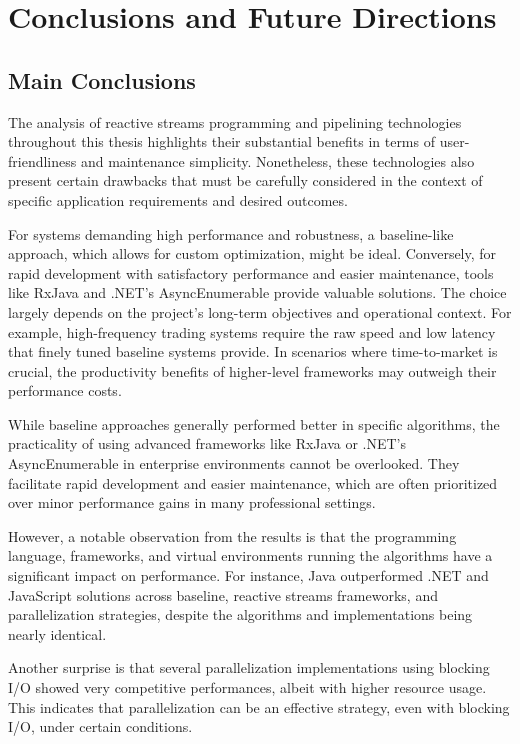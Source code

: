 \chapter{Conclusions and Future Directions}

\section{Main Conclusions}

The analysis of reactive streams programming and pipelining technologies throughout this thesis highlights their substantial benefits in terms of user-friendliness and maintenance simplicity. Nonetheless, these technologies also present certain drawbacks that must be carefully considered in the context of specific application requirements and desired outcomes.

For systems demanding high performance and robustness, a baseline-like approach, which allows for custom optimization, might be ideal. Conversely, for rapid development with satisfactory performance and easier maintenance, tools like RxJava and .NET's AsyncEnumerable provide valuable solutions. The choice largely depends on the project's long-term objectives and operational context. For example, high-frequency trading systems require the raw speed and low latency that finely tuned baseline systems provide. In scenarios where time-to-market is crucial, the productivity benefits of higher-level frameworks may outweigh their performance costs.

While baseline approaches generally performed better in specific algorithms, the practicality of using advanced frameworks like RxJava or .NET's AsyncEnumerable in enterprise environments cannot be overlooked. They facilitate rapid development and easier maintenance, which are often prioritized over minor performance gains in many professional settings.

However, a notable observation from the results is that the programming language, frameworks, and virtual environments running the algorithms have a significant impact on performance. For instance, Java outperformed .NET and JavaScript solutions across baseline, reactive streams frameworks, and parallelization strategies, despite the algorithms and implementations being nearly identical.

Another surprise is that several parallelization implementations using blocking I/O showed very competitive performances, albeit with higher resource usage. This indicates that parallelization can be an effective strategy, even with blocking I/O, under certain conditions.

